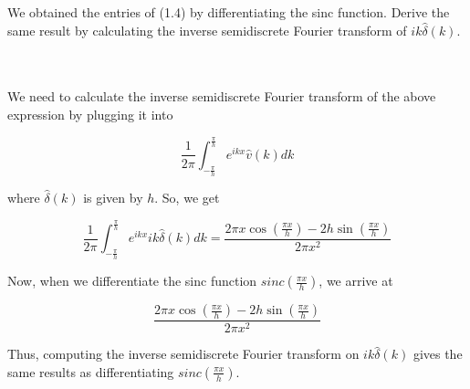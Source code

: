 We obtained the entries of (1.4) by differentiating the sinc function. Derive the same result by
calculating the inverse semidiscrete Fourier transform of $ik\hat{\delta}(k)$.\\\\

\begin{solution}\renewcommand{\qedsymbol}{}\ \\
    We need to calculate the inverse semidiscrete Fourier transform of the above expression by plugging
    it into

    $$\frac{1}{2\pi}\int_{-\frac{\pi}{h}}^{\frac{\pi}{h}}e^{ikx}\hat{v}(k)dk$$

    where $\hat{\delta}(k)$ is given by $h$. So, we get

    $$\frac{1}{2\pi}\int_{-\frac{\pi}{h}}^{\frac{\pi}{h}}e^{ikx}ik\hat{\delta}(k)dk=
    \frac{2\pi x\cos(\frac{\pi x}{h})-2h\sin(\frac{\pi x}{h})}{2\pi x^2}$$

    Now, when we differentiate the sinc function $sinc(\frac{\pi x}{h})$, we arrive at

    $$\frac{2\pi x\cos(\frac{\pi x}{h})-2h\sin(\frac{\pi x}{h})}{2\pi x^2}$$

    Thus, computing the inverse semidiscrete Fourier transform on $ik\hat{\delta}(k)$ gives the same
    results as differentiating $sinc(\frac{\pi x}{h})$.

\end{solution}